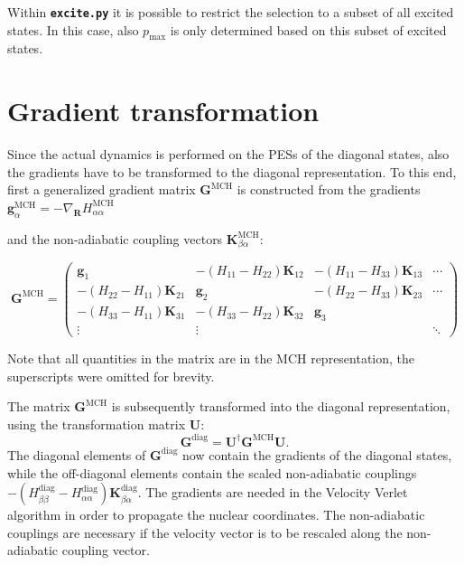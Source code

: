 \documentclass[a4paper,11pt,DIV=15,openany,twoside=false]{scrbook}
\newcommand{\ttmdump}[1]{#1}
\newcommand{\ttt}[1]{\textbf{\texttt{#1}}}
\newcommand{\VEC}[1]{\ensuremath{\mathbf{#1}}}
\begin{document}
Within \ttt{excite.py} it is possible to restrict the selection to a subset of all excited states. In this case, also $p_{\text{max}}$ is only determined based on this subset of excited states.


\section{Gradient transformation}\label{met:gradtra}

Since the actual dynamics is performed on the PESs of the diagonal states, also the gradients have to be transformed to the diagonal representation. To this end, first a generalized gradient matrix $\VEC{G}^{\text{MCH}}$ is constructed from the gradients %
\ttmdump{%
$\VEC{g}^{\text{MCH}}_\alpha=-\nabla_\VEC{R}H_{\alpha\alpha}^{\text{MCH}}$%
}
and the non-adiabatic coupling vectors 
$\VEC{K}_{\beta\alpha}^{\text{MCH}}$:
\ttmdump{
  \begin{equation}
    \VEC{G}^{\text{MCH}}=
    \begin{pmatrix}
      \VEC{g}_1   &-(H_{11}-H_{22})\VEC{K}_{12} &-(H_{11}-H_{33})\VEC{K}_{13} &\cdots\\
      -(H_{22}-H_{11})\VEC{K}_{21}      &\VEC{g}_2      &-(H_{22}-H_{33})\VEC{K}_{23}&\cdots\\
      -(H_{33}-H_{11})\VEC{K}_{31}      &-(H_{33}-H_{22})\VEC{K}_{32} &\VEC{g}_3\\
      \vdots      &\vdots         &       &\ddots
    \end{pmatrix}
  \end{equation}
}
Note that all quantities in the matrix are in the MCH representation, the superscripts were omitted for brevity.

The matrix $\VEC{G}^{\text{MCH}}$ is subsequently transformed into the diagonal representation, using the transformation matrix $\VEC{U}$:
\begin{equation}
  \VEC{G}^{\text{diag}}=\VEC{U}^\dagger\VEC{G}^{\text{MCH}}\VEC{U}.
\end{equation}
The diagonal elements of $\VEC{G}^{\text{diag}}$ now contain the gradients of the diagonal states, while the off-diagonal elements contain the scaled non-adiabatic couplings $-(H^{\text{diag}}_{\beta\beta}-H^{\text{diag}}_{\alpha\alpha})\VEC{K}_{\beta\alpha}^{\text{diag}}$. The gradients are needed in the Velocity Verlet algorithm in order to propagate the nuclear coordinates. The non-adiabatic couplings are necessary if the velocity vector is to be rescaled along the non-adiabatic coupling vector.
\end{document}
